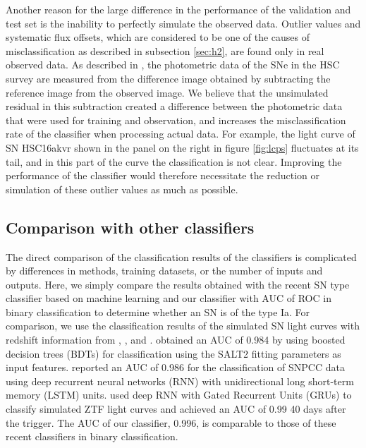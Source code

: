 \documentclass[useamsfonts]{pasj01}
\begin{document}
Another reason for the large difference in the performance of the validation and test set is the inability to perfectly simulate the observed data.
Outlier values and systematic flux offsets, which are considered to be one of the causes of misclassification as described in subsection \ref{sec:h2}, are found only in real observed data.
As described in \citet{yasuda19a}, the photometric data of the SNe in the HSC survey are measured from the difference image obtained by subtracting the reference image from the observed image.
We believe that the unsimulated residual in this subtraction created a difference between the photometric data that were used for training and observation, and increases the misclassification rate of the classifier when processing actual data.
For example, the light curve of SN HSC16akvr shown in the panel on the right in figure \ref{fig:lcps} fluctuates at its tail, and in this part of the curve the classification is not clear.
Improving the performance of the classifier would therefore necessitate the reduction or simulation of these outlier values as much as possible.
%
%
%
\subsection{Comparison with other classifiers}
\label{sec:comparison}
%
The direct comparison of the classification results of the classifiers is complicated by differences in methods, training datasets, or the number of inputs and outputs. 
Here, we simply compare the results obtained with the recent SN type classifier based on machine learning and our classifier with AUC of ROC in binary classification to determine whether an SN is of the type Ia.
For comparison, we use the classification results of the simulated SN light curves with redshift information from \citet{Lochner_2016}, \citet{charnock17a}, and \citet{Muthukrishna_2019}.
\citet{Lochner_2016} obtained an AUC of 0.984 by using boosted decision trees (BDTs) for classification using the SALT2 fitting parameters as input features.
\citet{charnock17a} reported an AUC of 0.986 for the classification of SNPCC data using deep recurrent neural networks (RNN) with unidirectional long short-term memory (LSTM) units.
\citet{Muthukrishna_2019} used deep RNN with Gated Recurrent Units (GRUs) to classify simulated ZTF light curves and achieved an AUC of 0.99 40 days after the trigger.
The AUC of our classifier, 0.996, is comparable to those of these recent classifiers in binary classification.
\end{document}
